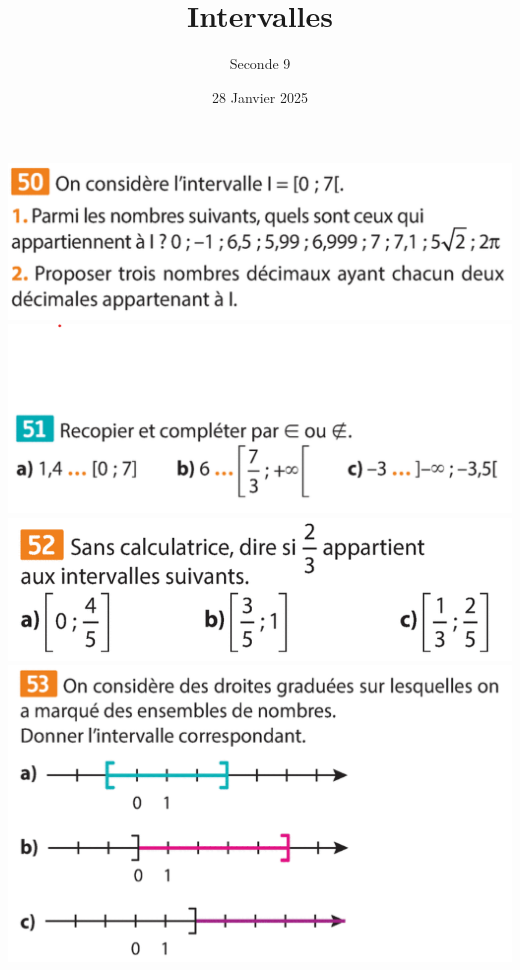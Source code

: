 \documentclass{article}
\title{Intervalles}
\author{Seconde 9}
\date{28 Janvier 2025}
\begin{document}
\maketitle

\begin{center}
\includegraphics[width=\textwidth]{Exercice_1.png}
\includegraphics[width=\textwidth]{Exercice_2.png}
\includegraphics[width=\textwidth]{Exercice_3.png}
\includegraphics[width=\textwidth]{Exercice_4.png}
\end{center}
\end{document}
